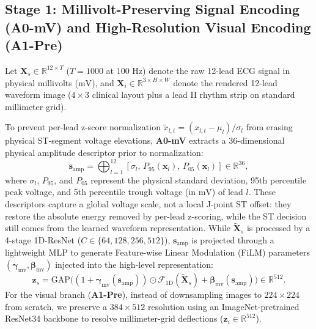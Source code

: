 \documentclass[preprint,12pt]{elsarticle}
\begin{document}
\subsection{Stage 1: Millivolt-Preserving Signal Encoding (A0-mV) and High-Resolution Visual Encoding (A1-Pre)}
Let $\bm{X}_s \in \mathbb{R}^{12 \times T}$ ($T=1000$ at $100\text{ Hz}$) denote the raw 12-lead ECG signal in physical millivolts ($\text{mV}$), and $\bm{X}_i \in \mathbb{R}^{3 \times H \times W}$ denote the rendered 12-lead waveform image ($4 \times 3$ clinical layout plus a lead II rhythm strip on standard millimeter grid).

To prevent per-lead z-score normalization $\tilde{x}_{l,t} = (x_{l,t} - \mu_l)/\sigma_l$ from erasing physical ST-segment voltage elevations, \textbf{A0-mV} extracts a 36-dimensional physical amplitude descriptor prior to normalization:
\begin{equation}
    \bm{s}_{\text{amp}} = \bigoplus_{l=1}^{12} \left[ \sigma_l, \, P_{95}(\bm{x}_l), \, P_{05}(\bm{x}_l) \right] \in \mathbb{R}^{36},
\end{equation}
where $\sigma_l$, $P_{95}$, and $P_{05}$ represent the physical standard deviation, 95th percentile peak voltage, and 5th percentile trough voltage (in $\text{mV}$) of lead $l$. These descriptors capture a global voltage scale, not a local J-point ST offset: they restore the absolute energy removed by per-lead z-scoring, while the ST decision still comes from the learned waveform representation. While $\tilde{\bm{X}}_s$ is processed by a 4-stage 1D-ResNet ($C \in \{64, 128, 256, 512\}$), $\bm{s}_{\text{amp}}$ is projected through a lightweight MLP to generate Feature-wise Linear Modulation (FiLM) parameters $(\bm{\gamma}_{\text{mv}}, \bm{\beta}_{\text{mv}})$ injected into the high-level representation:
\begin{equation}
    \bm{z}_s = \text{GAP}\Big( (1 + \bm{\gamma}_{\text{mv}}(\bm{s}_{\text{amp}})) \odot \mathcal{F}_{\text{1D}}(\tilde{\bm{X}}_s) + \bm{\beta}_{\text{mv}}(\bm{s}_{\text{amp}}) \Big) \in \mathbb{R}^{512}.
\end{equation}
For the visual branch (\textbf{A1-Pre}), instead of downsampling images to $224 \times 224$ from scratch, we preserve a $384 \times 512$ resolution using an ImageNet-pretrained ResNet34 backbone to resolve millimeter-grid deflections ($\bm{z}_i \in \mathbb{R}^{512}$).
\end{document}

